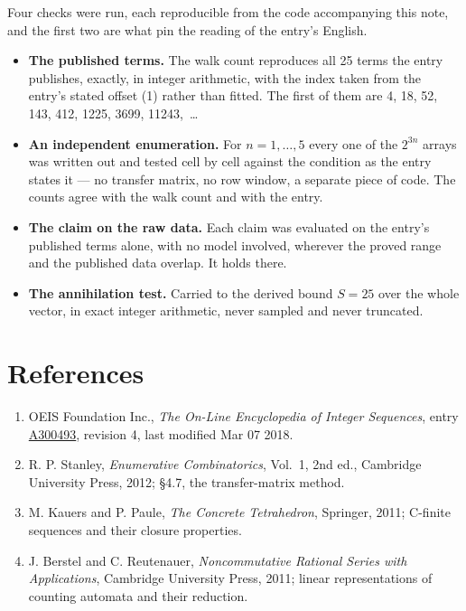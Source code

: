 \documentclass[11pt]{article}
\theoremstyle{definition}
\begin{document}
Four checks were run, each reproducible from the code accompanying this note, and the first two are what pin the reading of the entry's English.

\begin{itemize}

\item {\bfseries The published terms.} The walk count reproduces all 25 terms the entry publishes, exactly, in integer arithmetic, with the index taken from the entry's stated offset (1) rather than fitted. The first of them are 4, 18, 52, 143, 412, 1225, 3699, 11243,~\dots

\item {\bfseries An independent enumeration.} For $n = 1,\dots,5$ every one of the $2^{3n}$ arrays was written out and tested cell by cell against the condition as the entry states it --- no transfer matrix, no row window, a separate piece of code. The counts agree with the walk count and with the entry.

\item {\bfseries The claim on the raw data.} Each claim was evaluated on the entry's published terms alone, with no model involved, wherever the proved range and the published data overlap. It holds there.

\item {\bfseries The annihilation test.} Carried to the derived bound $S = 25$ over the whole vector, in exact integer arithmetic, never sampled and never truncated.

\end{itemize}

\section{References}

\begin{enumerate}

\item OEIS Foundation Inc., \emph{The On-Line Encyclopedia of Integer Sequences}, entry \href{https://oeis.org/A300493}{A300493}, revision 4, last modified Mar 07 2018.

\item R. P. Stanley, \emph{Enumerative Combinatorics}, Vol.~1, 2nd ed., Cambridge University Press, 2012; \S4.7, the transfer-matrix method.

\item M. Kauers and P. Paule, \emph{The Concrete Tetrahedron}, Springer, 2011; C-finite sequences and their closure properties.

\item J. Berstel and C. Reutenauer, \emph{Noncommutative Rational Series with Applications}, Cambridge University Press, 2011; linear representations of counting automata and their reduction.

\end{enumerate}
\end{document}
